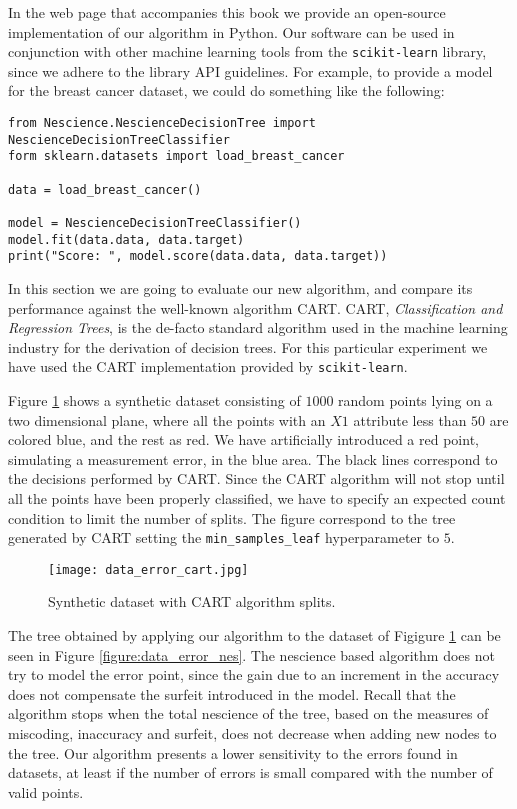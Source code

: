 In the web page that accompanies this book we provide an open-source implementation of our algorithm in Python. Our software can be used in conjunction with other machine learning tools from the \texttt{scikit-learn} library, since we adhere to the library API guidelines. For example, to provide a model for the breast cancer dataset, we could do something like the following:

\begin{sourcecode}
{\scriptsize \begin{verbatim}
from Nescience.NescienceDecisionTree import NescienceDecisionTreeClassifier
form sklearn.datasets import load_breast_cancer

data = load_breast_cancer()

model = NescienceDecisionTreeClassifier()
model.fit(data.data, data.target)
print("Score: ", model.score(data.data, data.target))
\end{verbatim}}
\end{sourcecode}

In this section we are going to evaluate our new algorithm, and compare its performance against the well-known algorithm CART. CART, \emph{Classification and Regression Trees}, is the de-facto standard algorithm used in the machine learning industry for the derivation of decision trees. For this particular experiment we have used the CART implementation provided by \texttt{scikit-learn}.

Figure \ref{figure:data_error_cart} shows a synthetic dataset consisting of $1000$ random points lying on a two dimensional plane, where all the points with an $X1$ attribute less than $50$ are colored blue, and the rest as red. We have artificially introduced a red point, simulating a measurement error, in the blue area. The black lines correspond to the decisions performed by CART. Since the CART algorithm will not stop until all the points have been properly classified, we have to specify an expected count condition to limit the number of splits. The figure correspond to the tree generated by CART setting the \texttt{min\_samples\_leaf} hyperparameter to $5$.

\begin{figure}[h]
\centering
\texttt{[image: data\_error\_cart.jpg]}
\caption{Synthetic dataset with CART algorithm splits.}
\label{figure:data_error_cart}
\end{figure}

The tree obtained by applying our algorithm to the dataset of Figigure \ref{figure:data_error_cart} can be seen in Figure \ref{figure:data_error_nes}. The nescience based algorithm does not try to model the error point, since the gain due to an increment in the accuracy does not compensate the surfeit introduced in the model. Recall that the algorithm stops when the total nescience of the tree, based on the measures of miscoding, inaccuracy and surfeit, does not decrease when adding new nodes to the tree. Our algorithm presents a lower sensitivity to the errors found in datasets, at least if the number of errors is small compared with the number of valid points.

